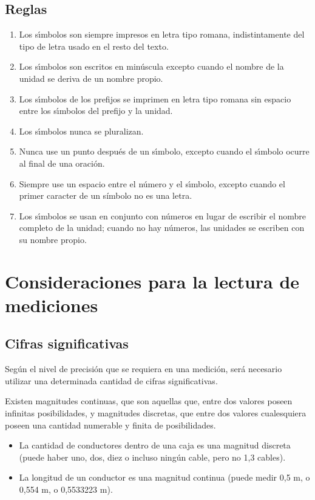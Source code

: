 \subsection{Reglas}
\begin{enumerate}
	\item Los sı́mbolos son siempre impresos en letra tipo romana, indistintamente del tipo de letra usado en el resto del texto.
	\item Los sı́mbolos son escritos en minúscula excepto cuando el nombre de la unidad se deriva de un nombre propio.
	\item Los sı́mbolos de los prefijos se imprimen en letra tipo romana sin espacio entre los sı́mbolos del prefijo y la unidad.
	\item Los sı́mbolos nunca se pluralizan.
	\item Nunca use un punto después de un sı́mbolo, excepto cuando el sı́mbolo ocurre al final de una oración.
	\item Siempre use un espacio entre el número y el sı́mbolo, excepto cuando el primer caracter de un símbolo no es una letra.
	\item Los sı́mbolos se usan en conjunto con números en lugar de escribir el nombre completo de la unidad; cuando no hay números, las unidades se escriben con su nombre propio.
	
\end{enumerate}
\section{Consideraciones para la lectura de mediciones}
\subsection{Cifras significativas}
Según el nivel de precisión que se requiera en una medición, será necesario utilizar una determinada cantidad de cifras significativas.

Existen magnitudes continuas, que son aquellas que, entre dos valores poseen infinitas posibilidades, y magnitudes discretas, que entre dos valores cualesquiera poseen una cantidad numerable y finita de posibilidades.

\begin{ejemplo}
	\begin{itemize}
		\item La cantidad de conductores dentro de una caja es una magnitud discreta (puede haber uno, dos, diez o incluso ningún cable, pero no 1,3 cables).
		\item La longitud de un conductor es una magnitud continua (puede medir 0,5 m, o 0,554 m, o 0,5533223 m).
	\end{itemize}
\end{ejemplo}

